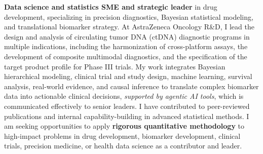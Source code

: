 
\textbf{Data science and statistics SME\textbf{ and strategic leade}r} in drug development, specializing in precision diagnostics, Bayesian statistical modeling, and translational biomarker strategy. At AstraZeneca Oncology R\&D, I lead the design and analysis of circulating tumor DNA (ctDNA) diagnostic programs in multiple indications, including the harmonization of cross-platform assays, the development of composite multimodal diagnostics, and the specification of the target product profile for Phase III trials. My work integrates Bayesian hierarchical modeling, clinical trial and study design,  machine learning, survival analysis, real-world evidence, and causal inference to translate complex biomarker data into actionable clinical decisions, \textit{supported by agentic AI tools}, which is communicated effectively to senior leaders. I have contributed to peer-reviewed publications and internal capability-building in advanced statistical methods. I am seeking opportunities to apply\textbf{ rigorous quantitative methodology} to high-impact problems in drug development, biomarker development, clinical trials,  precision medicine, or health data science as a contributor and leader.


